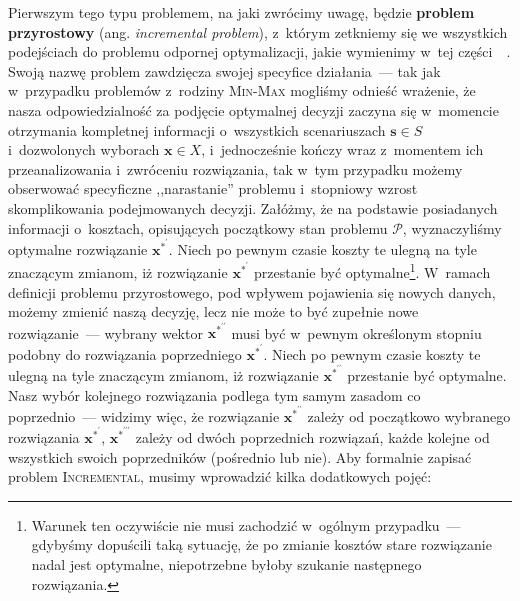 Pierwszym tego typu problemem, na jaki zwrócimy uwagę, będzie \textbf{problem przyrostowy} (ang. \textit{incremental problem}), z~którym zetkniemy się we wszystkich podejściach do problemu odpornej optymalizacji, jakie wymienimy w~tej części~\cite[$1$-$2$]{DBLP:journals/corr/NasrabadiO13}~\cite[$586$]{incNetOpt}.
Swoją nazwę problem zawdzięcza swojej specyfice działania~--- tak jak w~przypadku problemów z~rodziny \textsc{Min-Max} mogliśmy odnieść wrażenie, że nasza odpowiedzialność za podjęcie optymalnej decyzji zaczyna się w~momencie otrzymania kompletnej informacji o~wszystkich scenariuszach $\textbf{s} \in S$ i~dozwolonych wyborach $\textbf{x} \in X$, i~jednocześnie kończy wraz z~momentem ich przeanalizowania i~zwróceniu rozwiązania, tak w~tym przypadku możemy obserwować specyficzne ,,narastanie'' problemu i~stopniowy wzrost skomplikowania podejmowanych decyzji.
Załóżmy, że na podstawie posiadanych informacji o~kosztach, opisujących początkowy stan problemu $\mathcal{P}$, wyznaczyliśmy optymalne rozwiązanie $\textbf{x}^{\ast^{\prime}}$.
Niech po pewnym czasie koszty te ulegną na tyle znaczącym zmianom, iż rozwiązanie $\textbf{x}^{\ast^{\prime}}$ przestanie być optymalne\footnote{
	Warunek ten oczywiście nie musi zachodzić w~ogólnym przypadku~--- gdybyśmy dopuścili taką sytuację, że po zmianie kosztów stare rozwiązanie nadal jest optymalne, niepotrzebne byłoby szukanie następnego rozwiązania.
	}.
W~ramach definicji problemu przyrostowego, pod wpływem pojawienia się nowych danych, możemy zmienić naszą decyzję, lecz nie może to być zupełnie nowe rozwiązanie~--- wybrany wektor $\textbf{x}^{\ast^{\prime\prime}}$ musi być w~pewnym określonym stopniu podobny do rozwiązania poprzedniego $\textbf{x}^{\ast^{\prime}}$.
Niech po pewnym czasie koszty te ulegną na tyle znaczącym zmianom, iż rozwiązanie $\textbf{x}^{\ast^{\prime\prime}}$ przestanie być optymalne.
Nasz wybór kolejnego rozwiązania podlega tym samym zasadom co poprzednio~--- widzimy więc, że rozwiązanie $\textbf{x}^{\ast^{\prime\prime}}$ zależy od początkowo wybranego rozwiązania $\textbf{x}^{\ast^{\prime}}$, $\textbf{x}^{\ast^{\prime\prime\prime}}$ zależy od dwóch poprzednich rozwiązań, każde kolejne od wszystkich swoich poprzedników (pośrednio lub nie).
Aby formalnie zapisać problem \textsc{Incremental}, musimy wprowadzić kilka dodatkowych pojęć:

